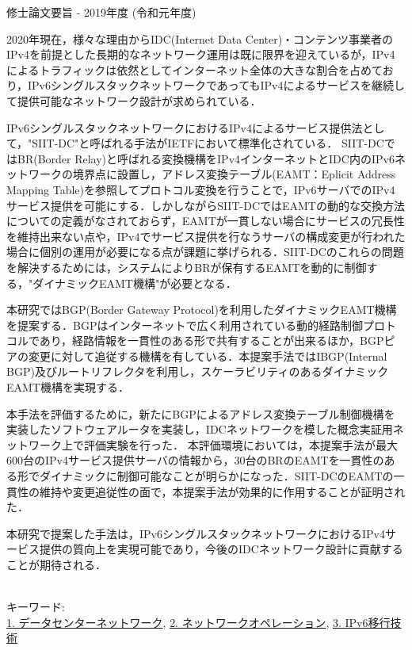 修士論文要旨 - 2019年度 (令和元年度)
\begin{center}
\begin{large}
\end{large}
\end{center}

2020年現在，様々な理由からIDC(Internet Data Center)・コンテンツ事業者のIPv4を前提とした長期的なネットワーク運用は既に限界を迎えているが，IPv4によるトラフィックは依然としてインターネット全体の大きな割合を占めており，IPv6シングルスタックネットワークであってもIPv4によるサービスを継続して提供可能なネットワーク設計が求められている．

IPv6シングルスタックネットワークにおけるIPv4によるサービス提供法として，"SIIT-DC"と呼ばれる手法がIETFにおいて標準化されている．
SIIT-DCではBR(Border Relay)と呼ばれる変換機構をIPv4インターネットとIDC内のIPv6ネットワークの境界点に設置し，アドレス変換テーブル(EAMT：Eplicit Address Mapping Table)を参照してプロトコル変換を行うことで，IPv6サーバでのIPv4サービス提供を可能にする．しかしながらSIIT-DCではEAMTの動的な交換方法についての定義がなされておらず，EAMTが一貫しない場合にサービスの冗長性を維持出来ない点や，IPv4でサービス提供を行なうサーバの構成変更が行われた場合に個別の運用が必要になる点が課題に挙げられる．SIIT-DCのこれらの問題を解決するためには，システムによりBRが保有するEAMTを動的に制御する，"ダイナミックEAMT機構"が必要となる．


本研究ではBGP(Border Gateway Protocol)を利用したダイナミックEAMT機構を提案する．BGPはインターネットで広く利用されている動的経路制御プロトコルであり，経路情報を一貫性のある形で共有することが出来るほか，BGPピアの変更に対して追従する機構を有している．本提案手法ではIBGP(Internal BGP)及びルートリフレクタを利用し，スケーラビリティのあるダイナミックEAMT機構を実現する．

本手法を評価するために，新たにBGPによるアドレス変換テーブル制御機構を実装したソフトウェアルータを実装し，IDCネットワークを模した概念実証用ネットワーク上で評価実験を行った．
本評価環境においては，本提案手法が最大600台のIPv4サービス提供サーバの情報から，30台のBRのEAMTを一貫性のある形でダイナミックに制御可能なことが明らかになった．SIIT-DCのEAMTの一貫性の維持や変更追従性の面で，本提案手法が効果的に作用することが証明された．

本研究で提案した手法は，IPv6シングルスタックネットワークにおけるIPv4サービス提供の質向上を実現可能であり，今後のIDCネットワーク設計に貢献することが期待される．


~ \\

キーワード:\\
\underline{1. データセンターネットワーク},
\underline{2. ネットワークオペレーション},
\underline{3. IPv6移行技術}
\begin{flushright}
\dept \\
\author
\end{flushright}
